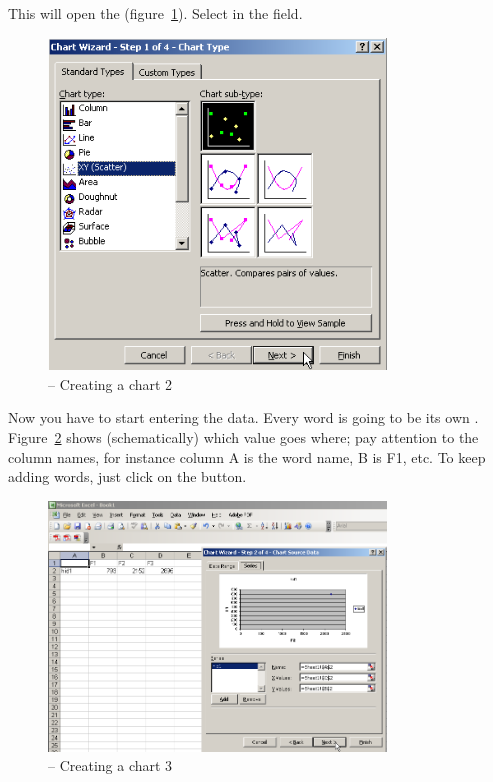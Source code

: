 This will open the  (figure~\ref{step2plot}). Select  in the  field.

\begin{figure}[!tbp]
\caption{\MSExcel{} -- Creating a chart 2}
\label{step2plot}
	\begin{center}
		\includegraphics[width=0.8\textwidth]{./figures/ExcelPlot1}
	\end{center}
\end{figure}

Now you have to start entering the data. Every word is going to be its own . Figure~\ref{step3plot} shows (schematically) which value goes where; pay attention to the column names, for instance column A is the word name, B is F1, etc. To keep adding words, just click on the  button.

\begin{figure}[!tbp]
\caption{\MSExcel{} -- Creating a chart 3}
\label{step3plot}
	\begin{center}
		\includegraphics[width=0.8\textwidth]{./figures/ExcelPlot3}
	\end{center}
\end{figure}

